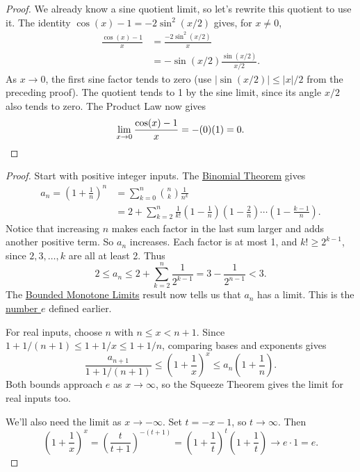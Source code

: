 
\begin{proof}
We already know a sine quotient limit, so let's rewrite this quotient
to use it. The identity $\cos(x)-1=-2\sin^2(x/2)$ gives, for $x\ne0$,
\begin{align*}
\frac{\cos(x)-1}{x}
&=\frac{-2\sin^2(x/2)}{x}\\
&=-\sin(x/2)\frac{\sin(x/2)}{x/2}.
\end{align*}
As $x\to0$, the first sine factor tends to zero
(use $|\sin(x/2)|\leq |x|/2$ from the preceding proof).
The quotient tends to 1 by the sine limit, since its angle $x/2$
also tends to zero. The Product Law now gives
\[
\lim_{x\to0}\frac{\cos(x)-1}{x}=-(0)(1)=0.
\qedhere
\]
\end{proof}


\begin{proof}
Start with positive integer inputs. The
\hyperref[source:proof:binomial-theorem]{Binomial Theorem} gives
\begin{align*}
a_n=\left(1+\frac1n\right)^n
&=\sum_{k=0}^n\binom nk\frac1{n^k}\\
&=2+\sum_{k=2}^n\frac1{k!}
 \left(1-\frac1n\right)\left(1-\frac2n\right)
 \cdots\left(1-\frac{k-1}{n}\right).
\end{align*}
Notice that increasing $n$ makes each
factor in the last sum larger and adds another positive term.
So $a_n$ increases. Each factor is at most 1, and
$k!\geq2^{k-1}$, since $2,3,\ldots,k$ are all at least 2. Thus
$$2\leq a_n\leq2+\sum_{k=2}^n\frac1{2^{k-1}}
=3-\frac1{2^{n-1}}<3.$$
The \hyperref[sec:bounded-monotone-limits]{Bounded Monotone Limits}
result now tells us that $a_n$ has a limit. This is the
\hyperref[def:eulers-number]{number $e$} defined earlier.

For real inputs, choose $n$ with $n\leq x<n+1$. Since
$1+1/(n+1)\leq1+1/x\leq1+1/n$, comparing bases and exponents gives
$$
\frac{a_{n+1}}{1+1/(n+1)}
\leq\left(1+\frac1x\right)^x
\leq a_n\left(1+\frac1n\right).
$$
Both bounds approach $e$ as $x\to\infty$, so the Squeeze Theorem
gives the limit for real inputs too.

We'll also need the limit as $x\to-\infty$. Set $t=-x-1$, so
$t\to\infty$. Then
$$\left(1+\frac1x\right)^x
=\left(\frac{t}{t+1}\right)^{-(t+1)}
=\left(1+\frac1t\right)^t\left(1+\frac1t\right)
\longrightarrow e\cdot1=e.$$
\end{proof}

